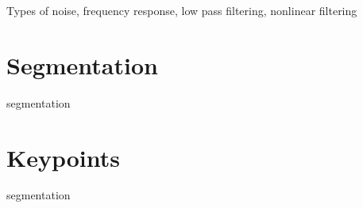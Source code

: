 Types of noise, frequency response, low pass filtering, nonlinear filtering


\section{Segmentation}
\label{sec:segmentation}

segmentation


\section{Keypoints}
\label{sec:keypoints}

segmentation

